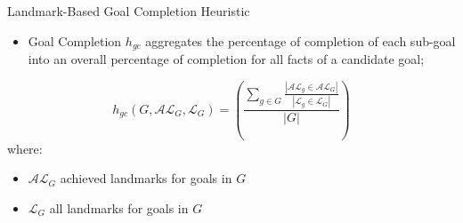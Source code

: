 \documentclass{beamer}
\begin{document}
    \begin{frame}{Landmark-Based Goal Completion Heuristic}
       	\begin{itemize}
       		\item Goal Completion $h_{gc}$ aggregates the percentage of completion of each sub-goal into an overall percentage of completion for all facts of a candidate goal;
		\end{itemize}
		
		\begin{equation}
			h_{gc}(G, \mathcal{AL}_{G}, \mathcal{L}_{G}) = \left(\frac{\sum_{g \in G} \frac{|\mathcal{AL}_{g} \in \mathcal{AL}_{G} |}{|\mathcal{L}_{g} \in \mathcal{L}_{G}|}}{ |G| }\right)
		\end{equation}
		where:
		\begin{itemize}
			\item $\mathcal{AL}_{G}$ achieved landmarks for goals in $G$
			\item $\mathcal{L}_{G}$ all landmarks for goals in $G$
		\end{itemize}
    \end{frame}
	
\end{document}
